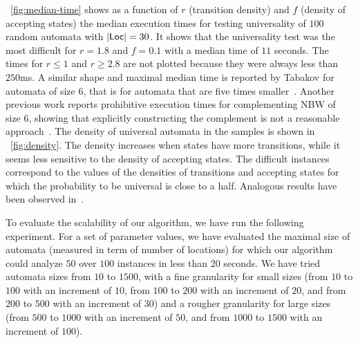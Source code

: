\documentclass{LMCS}
\def\abs#1{\ensuremath{\lvert #1\rvert}}
\newcommand{\Loc}{{\sf Loc}}
\begin{document}
\figurename~\ref{fig:median-time} shows as a function of $r$
(transition density) and $f$ (density of accepting states) the median
execution times for testing universality of $100$ random automata with
$\abs{\Loc}=30$.  It shows that the universality test was the most
difficult for $r=1.8$ and $f=0.1$ with a median time of $11$ seconds.
The times for $r \leq 1$ and $r \geq 2.8$ are not plotted because they
were always less than $250$ms.  A similar shape and maximal median
time is reported by Tabakov for automata
of size $6$, that is for automata that are five times smaller~\cite{TabakovV07}.  Another previous work reports prohibitive execution times for
complementing NBW of size $6$, showing that explicitly constructing
the complement is not a reasonable approach~\cite{GurumurthyKSV03}.
The density of universal automata in the samples is shown in \figurename~\ref{fig:density}.
The density increases when states have more transitions, while 
it seems less sensitive to the density of accepting states. The difficult 
instances correspond to the values of the densities of transitions and 
accepting states for which the probability to be universal is close to a half.
Analogous results have been observed in~\cite{TabakovV07}.


To evaluate the scalability of our algorithm, 
we have run the following experiment. For a set of
parameter values, we have evaluated the maximal size of automata
(measured in term of number of locations) for which our algorithm 
could analyze $50$ over $100$ instances in less than 20 seconds. 
We have tried automata sizes from $10$ to $1500$, with a fine granularity
for small sizes (from $10$ to $100$ with an increment of $10$, from 
$100$ to $200$ with an increment of $20$, and from $200$ to $500$ 
with an increment of $30$) and a rougher granularity for
large sizes (from $500$ to $1000$ with an increment of $50$, and
from $1000$ to $1500$ with an increment of $100$). 
\end{document}
